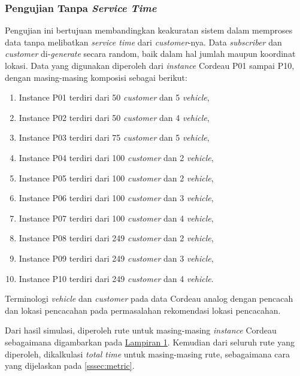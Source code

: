 \subsubsection{Pengujian Tanpa \textit{Service Time}}
Pengujian ini bertujuan membandingkan keakuratan sistem dalam memproses data tanpa melibatkan \textit{service time} dari \textit{customer}-nya. Data \textit{subscriber} dan \textit{customer} di-\textit{generate} secara random, baik dalam hal jumlah maupun koordinat lokasi. Data yang digunakan diperoleh dari \textit{instance} Cordeau P01 sampai P10, dengan masing-masing komposisi sebagai berikut:


\begin{enumerate}
	\item Instance P01 terdiri dari 50 \textit{customer} dan 5 \textit{vehicle},
	\item Instance P02 terdiri dari 50 \textit{customer} dan 4 \textit{vehicle}, 
	\item Instance P03 terdiri dari 75 \textit{customer} dan 5 \textit{vehicle}, 
	\item Instance P04 terdiri dari 100 \textit{customer} dan 2 \textit{vehicle}, 
	\item Instance P05 terdiri dari 100 \textit{customer} dan 2 \textit{vehicle}, 
	\item Instance P06 terdiri dari 100 \textit{customer} dan 3 \textit{vehicle}, 
	\item Instance P07 terdiri dari 100 \textit{customer} dan 4 \textit{vehicle}, 
	\item Instance P08 terdiri dari 249 \textit{customer} dan 2 \textit{vehicle}, 
	\item Instance P09 terdiri dari 249 \textit{customer} dan 3 \textit{vehicle}, 
	\item Instance P10 terdiri dari 249 \textit{customer} dan 4 \textit{vehicle}.
\end{enumerate}
Terminologi \textit{vehicle} dan \textit{customer} pada data Cordeau analog dengan pencacah dan lokasi pencacahan pada permasalahan rekomendasi lokasi pencacahan.


Dari hasil simulasi, diperoleh rute untuk masing-masing \textit{instance} Cordeau sebagaimana digambarkan pada \hyperref[ch:test_result_cordeau_notw]{Lampiran 1}. Kemudian dari seluruh rute yang diperoleh, dikalkulasi \textit{total time} untuk masing-masing rute, sebagaimana cara yang dijelaskan pada \autoref{sssec:metric}. 

